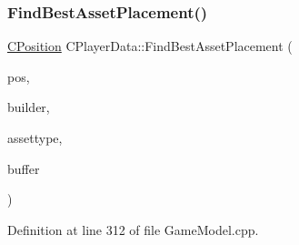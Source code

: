 \subsubsection{\texorpdfstring{Find\+Best\+Asset\+Placement()}{FindBestAssetPlacement()}}
{\footnotesize\ttfamily \hyperlink{classCPosition}{C\+Position} C\+Player\+Data\+::\+Find\+Best\+Asset\+Placement (\begin{DoxyParamCaption}\item[{const \hyperlink{classCPosition}{C\+Position} \&}]{pos,  }\item[{std\+::shared\+\_\+ptr$<$ \hyperlink{classCPlayerAsset}{C\+Player\+Asset} $>$}]{builder,  }\item[{\hyperlink{GameDataTypes_8h_a5600d4fc433b83300308921974477fec}{E\+Asset\+Type}}]{assettype,  }\item[{int}]{buffer }\end{DoxyParamCaption})}



Definition at line 312 of file Game\+Model.\+cpp.


